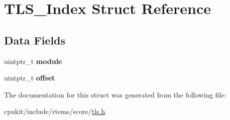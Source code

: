 \hypertarget{structTLS__Index}{}\section{T\+L\+S\+\_\+\+Index Struct Reference}
\label{structTLS__Index}
\subsection*{Data Fields}
\begin{DoxyCompactItemize}
\item 
\mbox{\label{structTLS__Index_ae47880d5a5318d520d8288da0ce21083}} 
uintptr\+\_\+t {\bfseries module}
\item 
\mbox{\label{structTLS__Index_a789a8b5f952a1a844a0ab0788427923b}} 
uintptr\+\_\+t {\bfseries offset}
\end{DoxyCompactItemize}


The documentation for this struct was generated from the following file\+:\begin{DoxyCompactItemize}
\item 
cpukit/include/rtems/score/\mbox{\hyperlink{tls_8h}{tls.\+h}}\end{DoxyCompactItemize}
